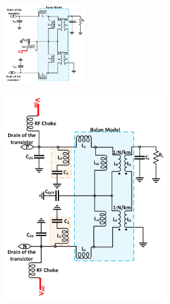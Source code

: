 \documentclass[conference]{IEEEtran}
\begin{document}
\begin{figure}[!t]
\captionsetup{font=footnotesize}
\centering
\begin{subfigure}{0.5\textwidth}
\centering
\includegraphics[width=0.4\textwidth]{Images/Design/Design_B_FC.jpg}
\caption{}
\label{fig:Design_B_FC}
\end{subfigure}
\begin{subfigure}{0.24\textwidth}
\centering
\includegraphics[width=0.8\textwidth]{Images/Design/Design_C_FC.jpg}
\caption{}
\label{fig:Design_C_FC}
\end{subfigure}
\centering
\begin{subfigure}{0.24\textwidth}

\end{subfigure}
\end{figure}
\end{document}
